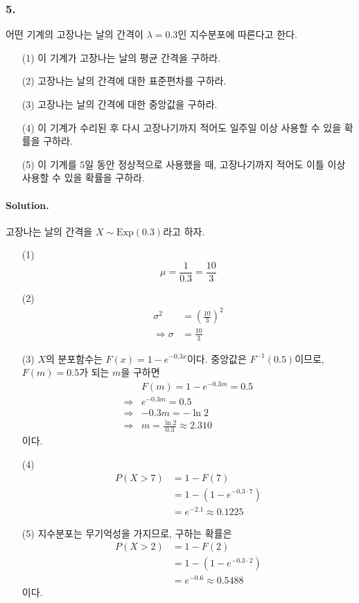 \subsubsection{5.} 어떤 기계의 고장나는 날의 간격이 $\lambda=0.3$인 지수분포에 따른다고 한다.

\begin{itemize}
	\item [(1)] 이 기계가 고장나는 날의 평균 간격을 구하라.
	\item [(2)] 고장나는 날의 간격에 대한 표준편차를 구하라.
	\item [(3)] 고장나는 날의 간격에 대한 중앙값을 구하라.
	\item [(4)] 이 기계가 수리된 후 다시 고장나기까지 적어도 일주일 이상 사용할 수 있을 확률을 구하라.
	\item [(5)] 이 기계를 5일 동안 정상적으로 사용했을 때, 고장나기까지 적어도 이틀 이상 사용할 수 있을 확률을 구하라.
\end{itemize}

\paragraph{Solution.} 고장나는 날의 간격을 $X \sim \mathrm{Exp}\left(0.3\right)$라고 하자.
\begin{itemize}
	\item [(1)] {
		\[\mu = \frac{1}{0.3} = \frac{10}{3}\]
	}
	\item [(2)] {
		\begin{align*}
			\sigma^2 &= \left(\frac{10}{3}\right)^2 \\
			\Rightarrow \sigma &= \frac{10}{3}
		\end{align*}
	}
	\item [(3)] {
		$X$의 분포함수는 $F\left(x\right)=1-e^{-0.3x}$이다. 중앙값은 $F^{-1}\left(0.5\right)$이므로, $F\left(m\right)=0.5$가 되는 $m$을 구하면
		\begin{align*}
			& F\left(m\right) = 1-e^{-0.3m} = 0.5 \\
			\Rightarrow& e^{-0.3m} = 0.5 \\
			\Rightarrow& -0.3m = -\ln 2 \\
			\Rightarrow& m = \frac{\ln 2}{0.3} \approx 2.310
		\end{align*}
		이다.
	}
	\item [(4)] {
		\begin{align*}
			P\left(X>7\right) &= 1 - F\left(7\right) \\
			&= 1 - \left(1-e^{-0.3\cdot 7}\right) \\
			&= e^{-2.1} \approx 0.1225
		\end{align*}
	}
	\item [(5)] {
		지수분포는 무기억성을 가지므로, 구하는 확률은
		\begin{align*}
			P\left(X>2\right) &= 1 - F\left(2\right) \\
			&= 1 - \left(1-e^{-0.3\cdot 2}\right) \\
			&= e^{-0.6} \approx 0.5488
		\end{align*}
		이다.
	}
\end{itemize}

